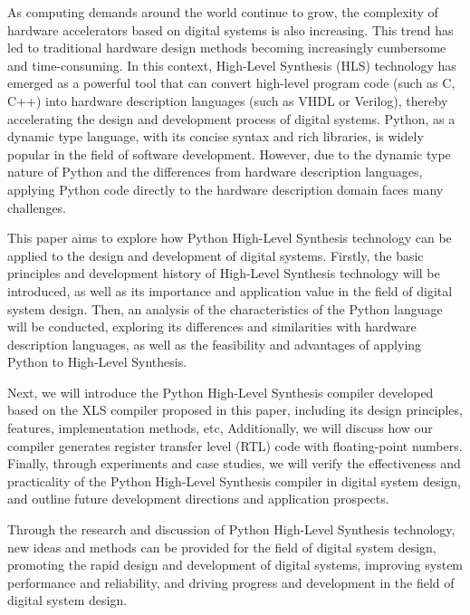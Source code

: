 \begin{enabstract}
As computing demands around the world continue to grow,
the complexity of hardware accelerators based on digital systems is also increasing.
This trend has led to traditional hardware design methods becoming increasingly cumbersome and time-consuming.
In this context, High-Level Synthesis (HLS) technology has emerged as a powerful tool 
that can convert high-level program code (such as C, C++) 
into hardware description languages (such as VHDL or Verilog), 
thereby accelerating the design and development process of digital systems. 
Python, as a dynamic type language, 
with its concise syntax and rich libraries, 
is widely popular in the field of software development. 
However, due to the dynamic type nature of Python 
and the differences from hardware description languages, 
applying Python code directly to the hardware description domain faces many challenges.

This paper aims to explore how Python High-Level Synthesis technology 
can be applied to the design and development of digital systems. 
Firstly, the basic principles and development history of High-Level Synthesis technology 
will be introduced, as well as its importance and application value 
in the field of digital system design. 
Then, an analysis of the characteristics of the Python language will be conducted, 
exploring its differences and similarities with hardware description languages, 
as well as the feasibility and advantages of applying Python to High-Level Synthesis. 

Next, we will introduce the Python High-Level Synthesis compiler developed 
based on the XLS compiler proposed in this paper, 
including its design principles, features, implementation methods, etc,
Additionally, we will discuss how our compiler generates register transfer level (RTL) 
code with floating-point numbers.
Finally, through experiments and case studies, 
we will verify the effectiveness and practicality of the Python High-Level Synthesis 
compiler in digital system design, 
and outline future development directions and application prospects.

Through the research and discussion of Python High-Level Synthesis technology, 
new ideas and methods can be provided for the field of digital system design, 
promoting the rapid design and development of digital systems, 
improving system performance and reliability, 
and driving progress and development in the field of digital system design.

\end{enabstract}